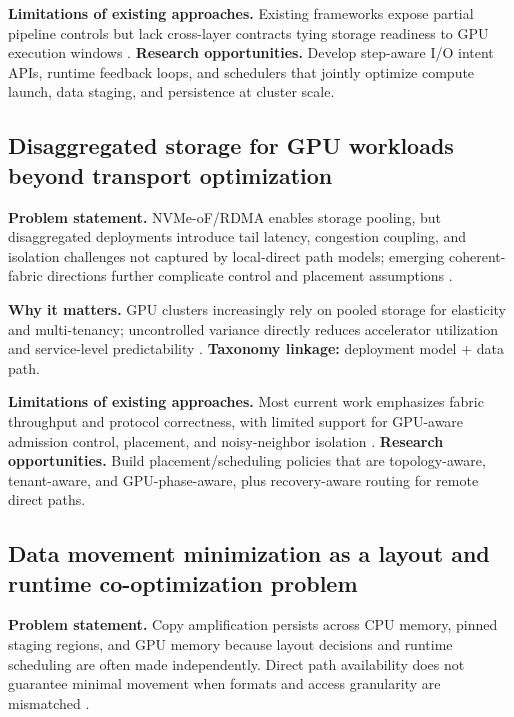 \textbf{Limitations of existing approaches.} Existing frameworks expose partial pipeline controls but lack cross-layer contracts tying storage readiness to GPU execution windows \cite{murray2021tfdata,geminifs2025}. \textbf{Research opportunities.} Develop step-aware I/O intent APIs, runtime feedback loops, and schedulers that jointly optimize compute launch, data staging, and persistence at cluster scale.

\subsection{Disaggregated storage for GPU workloads beyond transport optimization}

\textbf{Problem statement.} NVMe-oF/RDMA enables storage pooling, but disaggregated deployments introduce tail latency, congestion coupling, and isolation challenges not captured by local-direct path models; emerging coherent-fabric directions further complicate control and placement assumptions \cite{nvmeof_spec,infiniband_spec,liu2017rackscale,cxl_spec}.

\textbf{Why it matters.} GPU clusters increasingly rely on pooled storage for elasticity and multi-tenancy; uncontrolled variance directly reduces accelerator utilization and service-level predictability \cite{zhang2025hpcstoragesurvey,zhong2024distserve}. \textbf{Taxonomy linkage:} deployment model + data path.

\textbf{Limitations of existing approaches.} Most current work emphasizes fabric throughput and protocol correctness, with limited support for GPU-aware admission control, placement, and noisy-neighbor isolation \cite{nvmeof_spec,liu2017rackscale}. \textbf{Research opportunities.} Build placement/scheduling policies that are topology-aware, tenant-aware, and GPU-phase-aware, plus recovery-aware routing for remote direct paths.

\subsection{Data movement minimization as a layout and runtime co-optimization problem}

\textbf{Problem statement.} Copy amplification persists across CPU memory, pinned staging regions, and GPU memory because layout decisions and runtime scheduling are often made independently. Direct path availability does not guarantee minimal movement when formats and access granularity are mismatched \cite{nvidia_gds_overview,nvidia_gds_best_practices,silberstein2013gpufs}.

